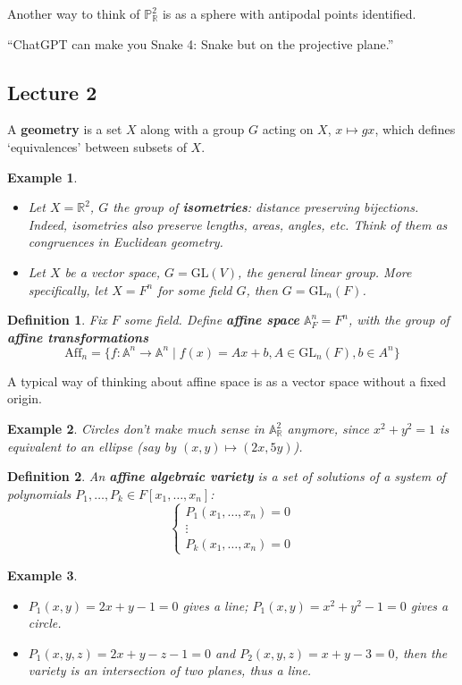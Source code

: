 \documentclass[12pt]{article}
\newcommand{\R}{\mathbb{R}}
\renewcommand{\P}{\mathbb{P}}
\newcommand{\GL}{\mathrm{GL}}
\newcommand{\A}{\mathbb{A}}
\newtheorem{definition}{Definition}[section]
\newtheorem*{example}{Example}
\begin{document}
        Another way to think of $\P_\R^2$ is as a sphere with antipodal points identified. \par
        ``ChatGPT can make you Snake 4: Snake but on the projective plane.''

    \subsection{Lecture 2}
    A \textbf{geometry} is a set $X$ along with a group $G$ acting on $X$, $x \mapsto gx$, which defines `equivalences' between subsets of $X$.
    \begin{example}
        \begin{itemize}
            \item Let $X = \R^2$, $G$ the group of \textbf{isometries}: distance preserving bijections. Indeed, isometries also preserve lengths, areas, angles, etc. Think of them as congruences in Euclidean geometry.
            \item Let $X$ be a vector space, $G = \text{GL}(V)$, the general linear group. More specifically, let $X = F^n$ for some field $G$, then $G = \GL_n(F)$.
        \end{itemize}
    \end{example}
    \begin{definition}
        Fix $F$ some field. Define \textbf{affine space} $\A_F^n = F^n$, with the group of \textbf{affine transformations} $$\mathrm{Aff}_n = \{f: \A^n \to \A^n \mid f(x) = Ax + b, A \in \GL_n(F), b \in A^n\}$$
    \end{definition}
    A typical way of thinking about affine space is as a vector space without a fixed origin.
    \begin{example}
        Circles don't make much sense in $\A_\R^2$ anymore, since $x^2 + y^2 = 1$ is equivalent to an ellipse (say by $(x, y) \mapsto (2x, 5y)$).
    \end{example}
    \begin{definition}
        An \textbf{affine algebraic variety} is a set of solutions of a system of polynomials $P_1, \dots, P_k \in F[x_1, \dots, x_n]$:
        $$\begin{cases}
            P_1(x_1, \dots, x_n) = 0 \\
            \vdots \\
            P_k(x_1, \dots, x_n) = 0
        \end{cases}$$
    \end{definition}
    \begin{example}
        \begin{itemize}
            \item $P_1(x, y) = 2x + y - 1 = 0$ gives a line; $P_1(x, y) = x^2 + y^2 - 1 = 0$ gives a circle.
            \item $P_1(x, y, z) = 2x+y-z-1 = 0$ and $P_2(x, y, z) = x + y -3 = 0$, then the variety is an intersection of two planes, thus a line.
        \end{itemize}
    \end{example}
\end{document}

